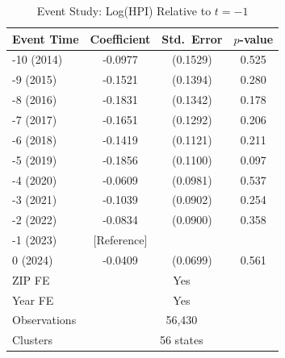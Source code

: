\begin{table}[htbp]
\centering
\caption{Event Study: Log(HPI) Relative to $t=-1$}
\label{tab:eventstudy}
\begin{tabular}{lccc}
\hline\hline
Event Time & Coefficient & Std.~Error & $p$-value \\
\hline
-10 (2014) & -0.0977 & (0.1529) & 0.525 \\
-9 (2015) & -0.1521 & (0.1394) & 0.280 \\
-8 (2016) & -0.1831 & (0.1342) & 0.178 \\
-7 (2017) & -0.1651 & (0.1292) & 0.206 \\
-6 (2018) & -0.1419 & (0.1121) & 0.211 \\
-5 (2019) & -0.1856 & (0.1100) & 0.097 \\
-4 (2020) & -0.0609 & (0.0981) & 0.537 \\
-3 (2021) & -0.1039 & (0.0902) & 0.254 \\
-2 (2022) & -0.0834 & (0.0900) & 0.358 \\
-1 (2023) & [Reference] & & \\
0 (2024) & -0.0409 & (0.0699) & 0.561 \\
\hline
ZIP FE & \multicolumn{3}{c}{Yes} \\
Year FE & \multicolumn{3}{c}{Yes} \\
Observations & \multicolumn{3}{c}{56,430} \\
Clusters & \multicolumn{3}{c}{56 states} \\
\hline\hline
\end{tabular}
\par{}
\end{table}


